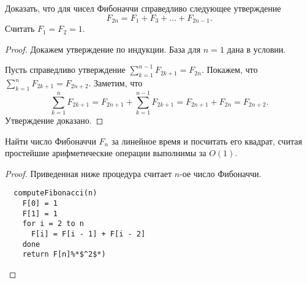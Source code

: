 
\begin{problem}
Доказать, что для чисел Фибоначчи справедливо следующее утверждение
$$
  F_{2n} = F_1 + F_3 + \dots + F_{2n - 1}.
$$
Считать $F_1 = F_2 = 1$. 
\end{problem}
\begin{proof}
Докажем утверждение по индукции. База для $n = 1$ дана в условии.

Пусть справедливо утверждение $\sum_{k = 1}^{n - 1} F_{2k + 1} = F_{2n}$.
Покажем, что $\sum_{k = 1}^{n} F_{2k + 1} = F_{2n + 2}$.
Заметим, что 
$$
\sum_{k = 1}^{n} F_{2k + 1} = F_{2n + 1} + \sum_{k = 1}^{n - 1} F_{2k + 1} = F_{2n + 1} + F_{2n} = F_{2n + 2}.
$$
Утверждение доказано.
\end{proof}

\begin{problem}
  Найти число Фибоначчи $F_n$ за линейное время и посчитать его квадрат, считая простейшие  
  арифметические операции выполнимы за $O(1)$.
\end{problem}
\begin{proof}
Приведенная ниже процедура считает $n$-ое число Фибоначчи.
  \begin{lstlisting}
  computeFibonacci(n)
    F[0] = 1
    F[1] = 1
    for i = 2 to n
      F[i] = F[i - 1] + F[i - 2]
    done
    return F[n]%*$^2$*)
  \end{lstlisting}
\end{proof}
